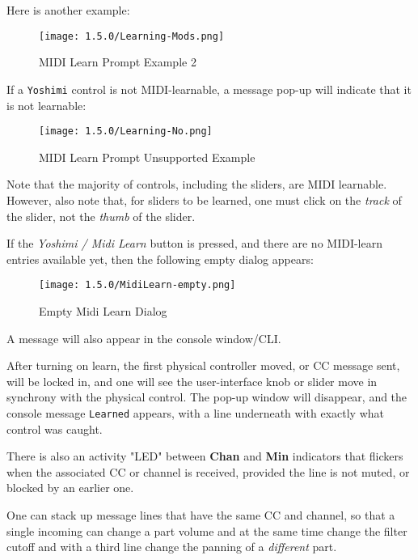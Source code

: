    Here is another example:

\begin{figure}[H]
   \centering
   \texttt{[image: 1.5.0/Learning-Mods.png]}
   \caption{MIDI Learn Prompt Example 2}
   \label{fig:midi_learn_ex_2}
\end{figure}

   If a \texttt{Yoshimi} control is not MIDI-learnable, a message pop-up
   will indicate that it is not
   learnable:

\begin{figure}[H]
   \centering
   \texttt{[image: 1.5.0/Learning-No.png]}
   \caption{MIDI Learn Prompt Unsupported Example}
   \label{fig:midi_learn_unsupported}
\end{figure}

   Note that the majority of controls, including the sliders, are MIDI
   learnable.  However, also note that, for sliders to be learned, one must
   click on the \textsl{track} of the slider, not the \textsl{thumb} of the
   slider.

   If the \textsl{Yoshimi / Midi Learn} button is pressed, and there are no
   MIDI-learn entries available yet, then the following empty dialog appears:

\begin{figure}[H]
   \centering
   \texttt{[image: 1.5.0/MidiLearn-empty.png]}
   \caption{Empty Midi Learn Dialog}
   \label{fig:empty_midi_learn_dialog}
\end{figure}

   A message will also appear in the console window/CLI.

   After turning on learn, the first physical controller moved, or CC message
   sent, will be locked in, and one will see the user-interface knob or slider
   move in synchrony with the physical control. The pop-up window will
   disappear, and the console message \texttt{Learned} appears, with a line
   underneath with exactly what control was caught.

   There is also an activity "LED" between \textbf{Chan} and
   \textbf{Min} indicators that flickers when the associated CC or channel
   is received, provided the line is not muted, or blocked by an earlier one.

   One can stack up message lines that have the same CC and channel, so that a
   single incoming can change a part volume and at the same time change the
   filter cutoff and with a third line change the panning of a
   \textsl{different} part.

